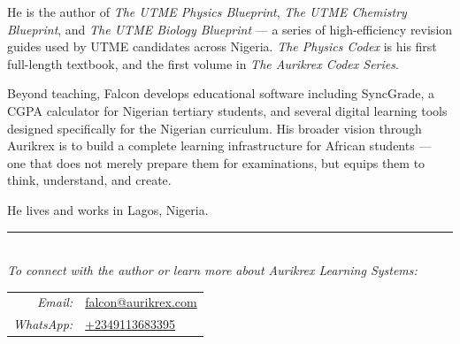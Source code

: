 \smallskip

\noindent He is the author of \textit{The UTME Physics Blueprint},
\textit{The UTME Chemistry Blueprint}, and
\textit{The UTME Biology Blueprint} --- a series of
high-efficiency revision guides used by UTME candidates
across Nigeria. \textit{The Physics Codex} is his first
full-length textbook, and the first volume in
\textit{The Aurikrex Codex Series}.

\smallskip

\noindent Beyond teaching, Falcon develops educational software including
SyncGrade, a CGPA calculator for Nigerian tertiary students,
and several digital learning tools designed specifically for
the Nigerian curriculum. His broader vision through Aurikrex
is to build a complete learning infrastructure for African
students --- one that does not merely prepare them for
examinations, but equips them to think, understand, and
create.

\smallskip

\noindent He lives and works in Lagos, Nigeria.

\vspace{0.4cm}
\begin{center}
\rule{0.45\linewidth}{0.4pt}\\[0.3cm]
{\small\itshape To connect with the author or learn more about Aurikrex Learning Systems:}\\[0.3cm]
\begin{tabular}{rl}
  \textit{Email:}    & \href{mailto:falcon@aurikrex.com}{falcon@aurikrex.com}\\[0.15cm]
  \textit{WhatsApp:} & \href{https://wa.me/2349113683395}{+2349113683395}\\
\end{tabular}
\end{center}
